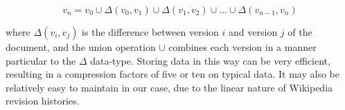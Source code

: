 $$v_n = v_0 \cup {\Delta}(v_0,v_1) \cup {\Delta}(v_1,v_2) \cup \dots
\cup {\Delta}(v_{n-1},v_n) $$

where ${\Delta}(v_i,v_j)$ is the difference between version $i$ and
version $j$ of the document, and the union operation $\cup$ combines
each version in a manner particular to the $\Delta$ data-type. Storing
data in this way can be very efficient, resulting in a compression
factors of five or ten on typical data.\cite{Macdonald2000} It may
also be relatively easy to maintain in our case, due to the linear
nature of Wikipedia revision histories.
